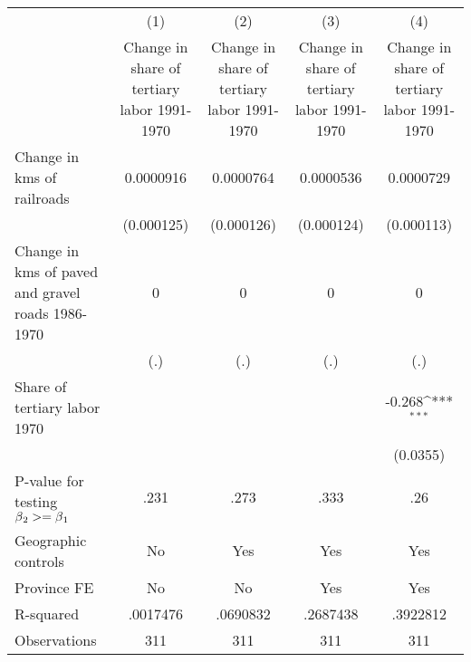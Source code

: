 {
\def\sym#1{\ifmmode^{#1}\else\(^{#1}\)\fi}
\begin{tabular}{l*{4}{c}}
\hline\hline
                &\multicolumn{1}{c}{(1)}&\multicolumn{1}{c}{(2)}&\multicolumn{1}{c}{(3)}&\multicolumn{1}{c}{(4)}\\
                &\multicolumn{1}{c}{Change in share of tertiary labor 1991-1970}&\multicolumn{1}{c}{Change in share of tertiary labor 1991-1970}&\multicolumn{1}{c}{Change in share of tertiary labor 1991-1970}&\multicolumn{1}{c}{Change in share of tertiary labor 1991-1970}\\
\hline
Change in kms of railroads&0.0000916         &0.0000764         &0.0000536         &0.0000729         \\
                &(0.000125)         &(0.000126)         &(0.000124)         &(0.000113)         \\
[1em]
Change in kms of paved and gravel roads 1986-1970&        0         &        0         &        0         &        0         \\
                &      (.)         &      (.)         &      (.)         &      (.)         \\
[1em]
Share of tertiary labor 1970&                  &                  &                  &   -0.268\sym{***}\\
                &                  &                  &                  & (0.0355)         \\
\hline
P-value for testing $\beta\\_2 >= \beta\\_1$&     .231         &     .273         &     .333         &      .26         \\
Geographic controls&       No         &      Yes         &      Yes         &      Yes         \\
Province FE     &       No         &       No         &      Yes         &      Yes         \\
R-squared       & .0017476         & .0690832         & .2687438         & .3922812         \\
Observations    &      311         &      311         &      311         &      311         \\
\hline\hline
\end{tabular}
}
